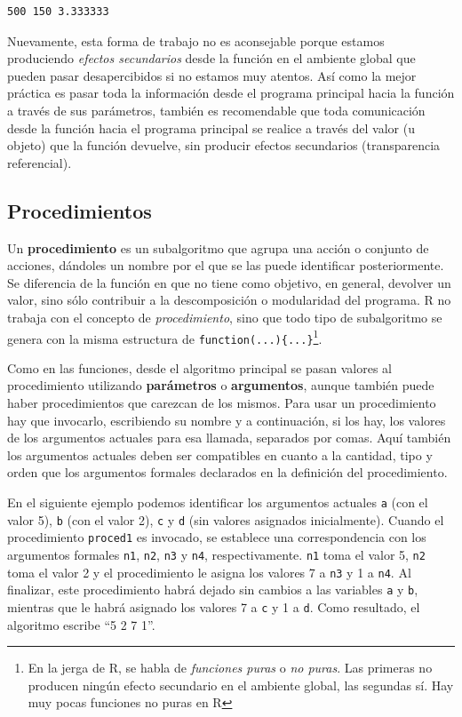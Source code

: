 \documentclass[
]{book}
\begin{document}
\begin{verbatim}
500 150 3.333333
\end{verbatim}

Nuevamente, esta forma de trabajo no es aconsejable porque estamos produciendo \emph{efectos secundarios} desde la función en el ambiente global que pueden pasar desapercibidos si no estamos muy atentos. Así como la mejor práctica es pasar toda la información desde el programa principal hacia la función a través de sus parámetros, también es recomendable que toda comunicación desde la función hacia el programa principal se realice a través del valor (u objeto) que la función devuelve, sin producir efectos secundarios (transparencia referencial).

\hypertarget{procedimientos}{%
\subsection{Procedimientos}\label{procedimientos}}

Un \textbf{procedimiento} es un subalgoritmo que agrupa una acción o conjunto de acciones, dándoles un nombre por el que se las puede identificar posteriormente. Se diferencia de la función en que no tiene como objetivo, en general, devolver un valor, sino sólo contribuir a la descomposición o modularidad del programa. R no trabaja con el concepto de \emph{procedimiento}, sino que todo tipo de subalgoritmo se genera con la misma estructura de \texttt{function(...)\{...\}}\footnote{En la jerga de R, se habla de \emph{funciones puras} o \emph{no puras}. Las primeras no producen ningún efecto secundario en el ambiente global, las segundas sí. Hay muy pocas funciones no puras en R}.

Como en las funciones, desde el algoritmo principal se pasan valores al procedimiento utilizando \textbf{parámetros} o \textbf{argumentos}, aunque también puede haber procedimientos que carezcan de los mismos. Para usar un procedimiento hay que invocarlo, escribiendo su nombre y a continuación, si los hay, los valores de los argumentos actuales para esa llamada, separados por comas. Aquí también los argumentos actuales deben ser compatibles en cuanto a la cantidad, tipo y orden que los argumentos formales declarados en la definición del procedimiento.

En el siguiente ejemplo podemos identificar los argumentos actuales \texttt{a} (con el valor 5), \texttt{b} (con el valor 2), \texttt{c} y \texttt{d} (sin valores asignados inicialmente). Cuando el procedimiento \texttt{proced1} es invocado, se establece una correspondencia con los argumentos formales \texttt{n1}, \texttt{n2}, \texttt{n3} y \texttt{n4}, respectivamente. \texttt{n1} toma el valor 5, \texttt{n2} toma el valor 2 y el procedimiento le asigna los valores 7 a \texttt{n3} y 1 a \texttt{n4}. Al finalizar, este procedimiento habrá dejado sin cambios a las variables \texttt{a} y \texttt{b}, mientras que le habrá asignado los valores 7 a \texttt{c} y 1 a \texttt{d}. Como resultado, el algoritmo escribe ``5 2 7 1''.
\end{document}
